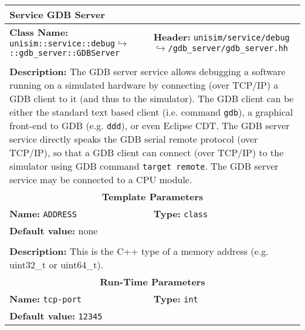 \newpage
\begin{center}
	\begin{tabular}{|p{7.5cm}|p{7.5cm}|}
		\hline
		\multicolumn{2}{|l|}{\textbf{\Large Service GDB Server}}\\
		\hline
		\multicolumn{1}{|p{7.5cm}}{\textbf{Class Name:} \newline \texttt{unisim::service::debug}\newline$\hookrightarrow$\texttt{::gdb\_server::GDBServer}} & \multicolumn{1}{p{7.5cm}|}{\textbf{Header:} \newline \texttt{unisim/service/debug}\newline$\hookrightarrow$\texttt{/gdb\_server/gdb\_server.hh}}\\
		\multicolumn{2}{|l|}{}\\
		\multicolumn{2}{|p{15cm}|}{\textbf{Description:} \newline The GDB server service allows debugging a software running on a simulated hardware by connecting (over TCP/IP) a GDB client to it (and thus to the simulator). The GDB client can be either the standard text based client (i.e. command \texttt{gdb}), a graphical front-end to GDB (e.g. \texttt{ddd}), or even Eclipse CDT. The GDB server service directly speaks the GDB serial remote protocol (over TCP/IP), so that a GDB client can connect (over TCP/IP) to the simulator using GDB command \texttt{target remote}. The GDB server service may be connected to a CPU module.}\\
		\hline
		\hline
		\multicolumn{2}{|c|}{\textbf{\large Template Parameters}}\\
		\hline
		\multicolumn{1}{|p{7.5cm}}{\textbf{Name:} \texttt{ADDRESS}} & \multicolumn{1}{p{7.5cm}|}{\textbf{Type:} \texttt{class}}\\
		\multicolumn{2}{|p{15cm}|}{\textbf{Default value:} none}\\
		\multicolumn{2}{|l|}{}\\
		\multicolumn{2}{|p{15cm}|}{\textbf{Description:} \newline This is the C++ type of a memory address (e.g. uint32\_t or uint64\_t).}\\
		\hline
		\hline
		\multicolumn{2}{|c|}{\textbf{\large Run-Time Parameters}}\\
		\hline
		\multicolumn{1}{|p{7.5cm}}{\textbf{Name:} \texttt{tcp-port}} & \multicolumn{1}{p{7.5cm}|}{\textbf{Type:} \texttt{int}}\\
		\multicolumn{2}{|p{15cm}|}{\textbf{Default value:} \texttt{12345}}\\

\end{tabular}
\end{center}

